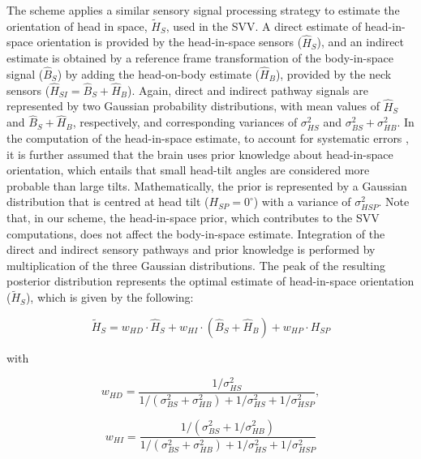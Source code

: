 The scheme applies a similar sensory signal processing strategy to estimate the orientation of head in space, $\tilde{H}_S$, used in the SVV. A direct estimate of head-in-space orientation is provided by the head-in-space sensors ($\hat{H}_S$), and an indirect estimate is obtained by a reference frame transformation of the body-in-space signal ($\hat{B}_S$) by adding the head-on-body estimate ($\hat{H}_B$), provided by the neck sensors ($\hat{H}_{SI} = \hat{B}_S + \hat{H}_B$). Again, direct and indirect pathway signals are represented by two Gaussian probability distributions, with mean values of $\hat{H}_S$ and $\hat{B}_S + \hat{H}_B$, respectively, and corresponding variances of $\sigma^2_{HS}$ and $\sigma^2_{BS} + \sigma^2_{HB}$. In the computation of the head-in-space estimate, to account for systematic errors \cite{macneilage2007, devrijer2008}, it is further assumed that the brain uses prior knowledge about head-in-space orientation, which entails that small head-tilt angles are considered more probable than large tilts. Mathematically, the prior is represented by a Gaussian distribution that is centred at  head tilt ($H_{SP} = 0^\circ$) with a variance of $\sigma^2_{HSP}$. Note that, in our scheme, the head-in-space prior, which contributes to the SVV computations, does not affect the body-in-space estimate. Integration of the direct and indirect sensory pathways and prior knowledge is performed by multiplication of the three Gaussian distributions. The peak of the resulting posterior distribution represents the optimal estimate of head-in-space orientation ($\tilde{H}_S$), which is given by the following: 

\begin{equation}
\label{p1:eqn6}
\tilde{H}_S = w_{HD} \cdot \hat{H}_S + w_{HI} \cdot (\hat{B}_S + \hat{H}_B) + w_{HP} \cdot H_{SP}
\end{equation}

with

\begin{equation}
\label{p1:eqn7}
w_{HD} = \frac{1 / \sigma^2_{HS}}{1 / (\sigma^2_{BS} + \sigma^2_{HB}) + 1/\sigma^2_{HS} + 1/\sigma^2_{HSP}},
\end{equation}

\begin{equation}
\label{p1:eqn8}
w_{HI} = \frac{1 / (\sigma^2_{BS} + 1/\sigma^2_{HB})}{1 / (\sigma^2_{BS} + \sigma^2_{HB}) + 1/\sigma^2_{HS} + 1/\sigma^2_{HSP}}
\end{equation}

